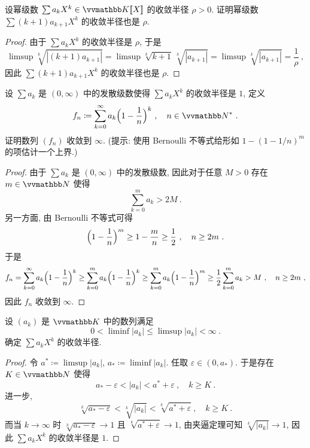 \begin{exercise}
    设幂级数 \(\sum a_k X^k \in \K[\![X]\!]\) 的收敛半径 \(\rho > 0\). 证明幂级数 \(\sum (k + 1) a_{k + 1} X^k\) 的收敛半径也是 \(\rho\).
\end{exercise}

\begin{proof}
    由于 \(\sum a_k X^k\) 的收敛半径是 \(\rho\), 于是
    \[
        \limsup \sqrt[k]{|(k + 1) a_{k + 1}|} = \limsup \sqrt[k]{k + 1}\, \sqrt[k]{|a_{k + 1}|} = \limsup \sqrt[k]{|a_{k + 1}|} = \frac{1}{\rho}\ ,
    \]
    因此 \(\sum (k + 1) a_{k + 1} X^k\) 的收敛半径也是 \(\rho\).
\end{proof}

\begin{exercise}
    设 \(\sum a_k\) 是 \((0, \infty)\) 中的发散级数使得 \(\sum a_k X^k\) 的收敛半径是 \(1\), 定义
    \[
        f_n \coloneqq \sum_{k = 0}^\infty a_k \Bigl(1 - \frac{1}{n}\Bigr)^k\ ,\quad n \in \N^\ast\ .
    \]
    证明数列 \((f_n)\) 收敛到 \(\infty\). (提示: 使用 Bernoulli 不等式给形如 \(1 - (1 - 1 / n)^m\) 的项估计一个上界.)
\end{exercise}

\begin{proof}
    由于 \(\sum a_k\) 是 \((0, \infty)\) 中的发散级数, 因此对于任意 \(M > 0\) 存在 \(m \in \N\) 使得
    \[
        \sum_{k = 0}^m a_k > 2 M\ .
    \]
    另一方面, 由 Bernoulli 不等式可得
    \[
        \Bigl(1 - \frac{1}{n}\Bigr)^m \geq 1 - \frac{m}{n} \geq \frac{1}{2}\ ,\quad n \geq 2 m\ .
    \]
    于是
    \[
        f_n = \sum_{k = 0}^\infty a_k \Bigl(1 - \frac{1}{n}\Bigr)^k \geq \sum_{k = 0}^m a_k \Bigl(1 - \frac{1}{n}\Bigr)^k \geq \sum_{k = 0}^m a_k \Bigl(1 - \frac{1}{n}\Bigr)^m \geq \frac{1}{2} \sum_{k = 0}^m a_k > M\ ,\quad n \geq 2 m\ ,
    \]
    因此 \(f_n\) 收敛到 \(\infty\).
\end{proof}

\begin{exercise}
    设 \((a_k)\) 是 \(\K\) 中的数列满足
    \[
        0 < \liminf |a_k| \leq \limsup |a_k| < \infty\ .
    \]
    确定 \(\sum a_k X^k\) 的收敛半径.
\end{exercise}

\begin{proof}
    令 \(a^\ast \coloneqq \limsup |a_k|\), \(a_\ast \coloneqq \liminf |a_k|\). 任取 \(\varepsilon \in (0, a_\ast)\). 于是存在 \(K \in \N\) 使得
    \[
        a_\ast - \varepsilon < |a_k| < a^\ast + \varepsilon\ ,\quad k \geq K\ .
    \]
    进一步,
    \[
        \sqrt[k]{a_\ast - \varepsilon} < \sqrt[k]{|a_k|} < \sqrt[k]{a^\ast + \varepsilon}\ ,\quad k \geq K\ .
    \]
    而当 \(k \to \infty\) 时 \(\sqrt[k]{a_\ast - \varepsilon} \to 1\) 且 \(\sqrt[k]{a^\ast + \varepsilon} \to 1\), 由夹逼定理可知 \(\sqrt[k]{|a_k|} \to 1\), 因此 \(\sum a_k X^k\) 的收敛半径是 \(1\).
\end{proof}

